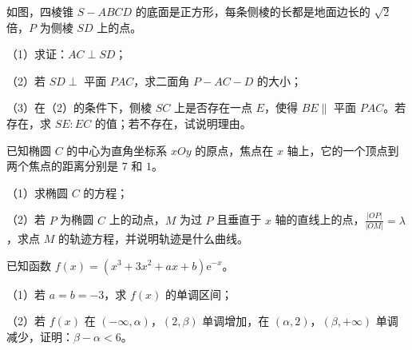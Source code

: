 \begin{question}
如图，四棱锥 $S-ABCD$ 的底面是正方形，每条侧棱的长都是地面边长的 $\sqrt2$ 倍，$P$ 为侧棱 $SD$ 上的点。

（1）求证：$AC\perp SD$；

（2）若 $SD\perp$ 平面 $PAC$，求二面角 $P-AC-D$ 的大小；

（3）在（2）的条件下，侧棱 $SC$ 上是否存在一点 $E$，使得 $BE\parallel$ 平面 $PAC$。若存在，求 $SE:EC$ 的值；若不存在，试说明理由。
\nopagebreak[4]
\begin{center}\end{center}
\nopagebreak[4]
\end{question}
\begin{question}
已知椭圆 $C$ 的中心为直角坐标系 $xOy$ 的原点，焦点在 $x$ 轴上，它的一个顶点到两个焦点的距离分别是 $7$ 和 $1$。

（1）求椭圆 $C$ 的方程；

（2）若 $P$ 为椭圆 $C$ 上的动点，$M$ 为过 $P$ 且垂直于 $x$ 轴的直线上的点，$\frac{|OP|}{|OM|}=\lambda$，求点 $M$ 的轨迹方程，并说明轨迹是什么曲线。

\end{question}
\begin{question}
已知函数 $f(x)=(x^3+3x^2+ax+b)\mathrm e^{-x}$。

（1）若 $a=b=-3$，求 $f(x)$ 的单调区间；

（2）若 $f(x)$ 在 $(-\infty,\alpha)$，$(2,\beta)$ 单调增加，在 $(\alpha,2)$，$(\beta,+\infty)$ 单调减少，证明：$\beta-\alpha<6$。

\end{question}

